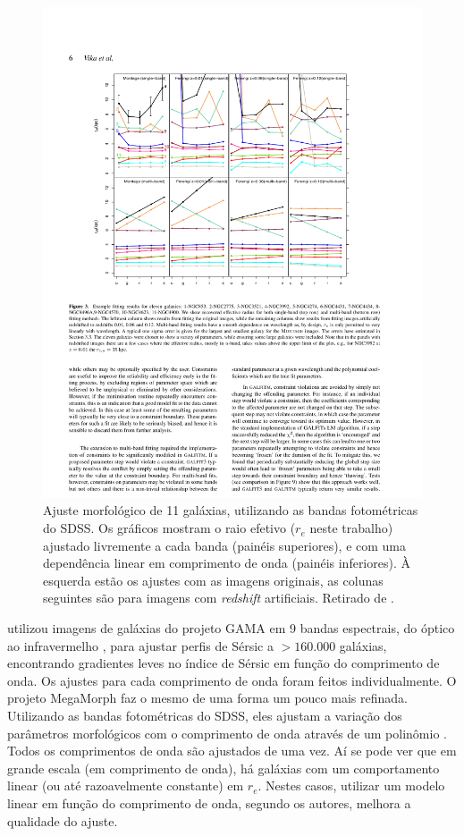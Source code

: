 \begin{figure}
	\includegraphics{figuras/vika-properties}
	\caption[Ajuste morfológico de bandas fotométricas] {Ajuste
	morfológico de 11 galáxias, utilizando as bandas fotométricas do
	SDSS. Os gráficos mostram o raio efetivo ($r_e$ neste trabalho) ajustado
	livremente a cada banda (painéis superiores), e com uma dependência linear em
	comprimento de onda (painéis inferiores). À esquerda estão os ajustes com as
	imagens originais, as colunas seguintes são para imagens com {\em redshift}
	artificiais. Retirado de \citet{Vika2013}.}
	\label{fig:propertiesVika}
\end{figure}

\citet{Kelvin2012} utilizou imagens de galáxias do projeto GAMA
\citep{Driver2009} em 9 bandas espectrais, do óptico \citep[bandas $ugriz$ do
DR7]{Abazajian2009} ao infravermelho \citep[bandas $YJHK$ do
UKIDSS]{Lawrence2007}, para ajustar perfis de Sérsic a $>\!160.000$ galáxias,
encontrando gradientes leves no índice de Sérsic em função do comprimento de
onda. Os ajustes para cada comprimento de onda foram feitos individualmente. O
projeto MegaMorph \citep{Haussler2013} faz o mesmo de uma forma um pouco mais
refinada. Utilizando as bandas fotométricas do SDSS, eles ajustam a variação dos
parâmetros morfológicos com o comprimento de onda através de um polinômio
\citep[Figura \ref{fig:propertiesVika}]{Vika2013}. Todos os comprimentos de onda
são ajustados de uma vez. Aí se pode ver que em grande escala (em comprimento de
onda), há galáxias com um comportamento linear (ou até razoavelmente constante)
em $r_e$. Nestes casos, utilizar um modelo linear em função do comprimento de
onda, segundo os autores, melhora a qualidade do ajuste.

